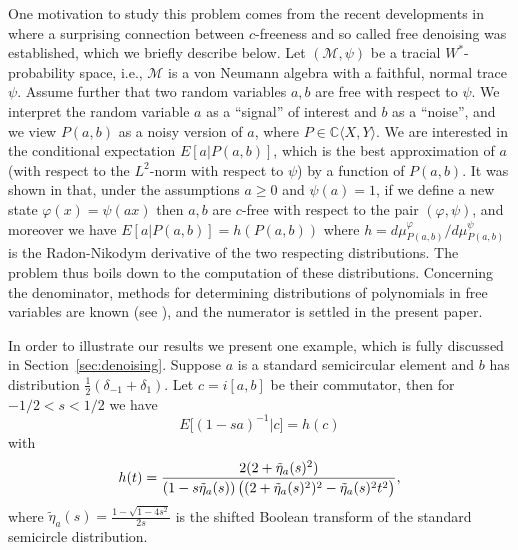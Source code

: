 \documentclass[12pt]{amsart}
\newcommand\IC{{\mathbb C}}
\def\E{E}
\newcommand{\alg}[1]{\mathcal{#1}}
\theoremstyle{definition}
\numberwithin{equation}{section}
\begin{document}
One motivation to study this problem comes from the recent developments in
\cite{FevrierNicaSzpojankowski:2024} where a surprising connection between
$c$-freeness and so called free denoising was established, which we briefly
describe below.
Let  $(\alg{M},\psi)$ be a tracial $W^*$-probability space, i.e.,
$\alg{M}$ is a von Neumann algebra with a faithful, normal trace
$\psi$.
Assume further that two random variables $a,b$ are free with respect to
$\psi$. We interpret the random variable $a$ as a ``signal'' of interest and
$b$ as a ``noise'', and we view $P(a,b)$ as a noisy version of $a$, where
$P\in\IC\langle X,Y \rangle$. We are interested in  the conditional expectation
$\E[a|P(a,b)]$, which is the best approximation of
$a$ (with respect to the $L^2$-norm with respect to $\psi$) by a function of $P(a,b)$.
It was shown in \cite{FevrierNicaSzpojankowski:2024} that, under the assumptions
$a\geq 0$ and $\psi(a)=1$, if we define a new state $\varphi(x)=\psi(a x)$ then
$a,b$ are $c$-free with respect to the pair $(\varphi,\psi)$, and moreover we
have $\E[a|P(a,b)]=h(P(a,b))$ where
$h=d\mu_{P(a,b)}^\varphi/d\mu_{P(a,b)}^\psi$ is the Radon-Nikodym
derivative of the two respecting distributions.
The problem thus boils down to the computation of these distributions.
Concerning the denominator, methods for determining distributions of polynomials in free
variables are known (see \cite{BelinschiMaiSpeicherSubordination,LehnerSzpojankowski:2023:freeint1}),
and the numerator is settled in the present paper.



%
%
%
In order to illustrate our results we present one example, which is fully
discussed in Section~\ref{sec:denoising}. Suppose $a$ is a standard
semicircular element and $b$ has distribution
$\tfrac{1}{2}\left(\delta_{-1}+\delta_1\right)$.
Let $c = i[a,b]$ be their commutator, then
for $-1/2<s<1/2$ we have
\[
  E\bigl[(1-sa)^{-1} | c\bigr]=h(c)
\]
with 
\[
  h(t)=\frac{2(2+\tilde{\eta}_a(s)^2)
  }{%
    (1-s\tilde{\eta}_a(s))\left((2+\tilde{\eta}_a(s)^2)^2-\tilde{\eta}_a(s)^2
      t^2\right)},
\]
where $\tilde{\eta}_a(s)=\frac{1-\sqrt{1-4 s^2}}{2 s}$ is the shifted Boolean transform of the standard semicircle distribution.
\end{document}
